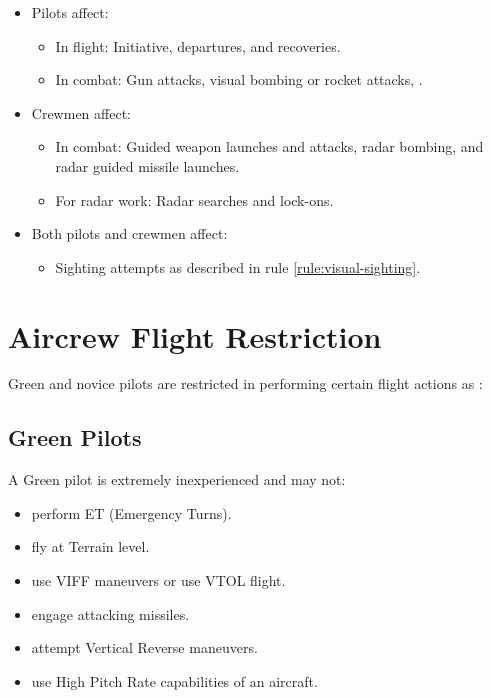 \begin{advancedrules}
    \begin{itemize}
        \item Pilots affect:
            \begin{itemize}
                \item In flight: Initiative, departures, and recoveries.
                \item In combat: Gun attacks, visual bombing or rocket attacks, .
            \end{itemize}

        \item Crewmen affect:
            \begin{itemize}
                \item In combat: Guided weapon launches and attacks, radar bombing, and radar guided missile launches.
                \item For radar work:  Radar searches and lock-ons.
            \end{itemize}

        \item Both pilots and crewmen affect:
            \begin{itemize}
                \item Sighting attempts as described in rule \ref{rule:visual-sighting}.
            \end{itemize}
    \end{itemize}

    \section{Aircrew Flight Restriction}


    Green and novice pilots are restricted in performing certain flight actions as :

    \subsection{Green Pilots} A Green pilot is extremely inexperienced and may not:
    \begin{itemize}
        \item perform ET (Emergency Turns).
        \item fly at Terrain level.
        \item use VIFF maneuvers or use VTOL flight.
        \item engage attacking missiles.
        \item attempt Vertical Reverse maneuvers.
        \item use High Pitch Rate capabilities of an aircraft.
    \end{itemize}


\end{advancedrules}
